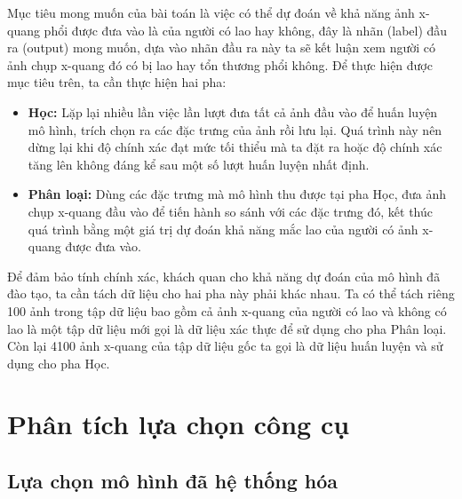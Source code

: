 Mục tiêu mong muốn của bài toán là việc có thể dự đoán về khả năng ảnh x-quang phổi được đưa vào là của người có lao hay không, đây là nhãn (label) đầu ra (output) mong muốn, dựa vào nhãn đầu ra này ta sẽ kết luận xem người có ảnh chụp x-quang đó có bị lao hay tổn thương phổi không. Để thực hiện được mục tiêu trên, ta cần thực hiện hai pha:
\begin{itemize}
	\item \textbf{Học:} Lặp lại nhiều lần việc lần lượt đưa tất cả ảnh đầu vào để huấn luyện mô hình, trích chọn ra các đặc trưng của ảnh rồi lưu lại. Quá trình này nên dừng lại khi độ chính xác đạt mức tối thiểu mà ta đặt ra hoặc độ chính xác tăng lên không đáng kể sau một số lượt huấn luyện nhất định. 
	\item \textbf{Phân loại:} Dùng các đặc trưng mà mô hình thu được tại pha Học, đưa ảnh chụp x-quang đầu vào để tiến hành so sánh với các đặc trưng đó, kết thúc quá trình bằng một giá trị dự đoán khả năng mắc lao của người có ảnh x-quang được đưa vào.
\end{itemize}

Để đảm bảo tính chính xác, khách quan cho khả năng dự đoán của mô hình đã đào tạo, ta cần tách dữ liệu cho hai pha này phải khác nhau. Ta có thể tách riêng 100 ảnh trong tập dữ liệu bao gồm cả ảnh x-quang của người có lao và không có lao là một tập dữ liệu mới gọi là dữ liệu xác thực để sử dụng cho pha Phân loại. Còn lại 4100 ảnh x-quang của tập dữ liệu gốc ta gọi là dữ liệu huấn luyện và sử dụng cho pha Học.

\section{Phân tích lựa chọn công cụ}
\subsection{Lựa chọn mô hình đã hệ thống hóa}

